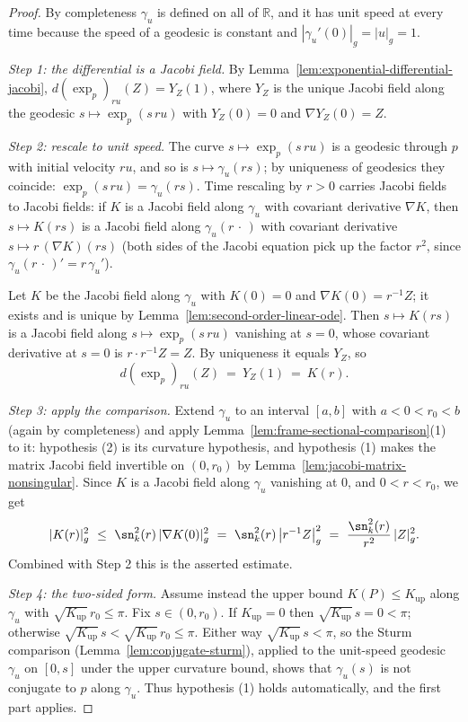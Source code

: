 \begin{proof}
\leanok
By completeness $\gamma_u$ is defined on all of $\mathbb R$, and it has unit
speed at every time because the speed of a geodesic is constant and
$|\gamma_u'(0)|_g=|u|_g=1$.

\emph{Step 1: the differential is a Jacobi field.} By
Lemma~\ref{lem:exponential-differential-jacobi},
$d(\exp_p)_{ru}(Z)=Y_Z(1)$, where $Y_Z$ is the unique Jacobi field along the
geodesic $s\mapsto\exp_p(s\,ru)$ with $Y_Z(0)=0$ and $\nabla Y_Z(0)=Z$.

\emph{Step 2: rescale to unit speed.} The curve $s\mapsto\exp_p(s\,ru)$ is a
geodesic through $p$ with initial velocity $ru$, and so is $s\mapsto\gamma_u(rs)$;
by uniqueness of geodesics they coincide:
$\exp_p(s\,ru)=\gamma_u(rs)$. Time rescaling by $r>0$ carries Jacobi fields to
Jacobi fields: if $K$ is a Jacobi field along $\gamma_u$ with covariant
derivative $\nabla K$, then $s\mapsto K(rs)$ is a Jacobi field along
$\gamma_u(r\,\cdot\,)$ with covariant derivative $s\mapsto r\,(\nabla K)(rs)$
(both sides of the Jacobi equation pick up the factor $r^2$, since
$\gamma_u(r\,\cdot\,)'=r\,\gamma_u'$).

Let $K$ be the Jacobi field along $\gamma_u$ with $K(0)=0$ and $\nabla
K(0)=r^{-1}Z$; it exists and is unique by
Lemma~\ref{lem:second-order-linear-ode}. Then $s\mapsto K(rs)$ is a Jacobi
field along $s\mapsto\exp_p(s\,ru)$ vanishing at $s=0$, whose covariant
derivative at $s=0$ is $r\cdot r^{-1}Z=Z$. By uniqueness it equals $Y_Z$, so
$$d(\exp_p)_{ru}(Z)\ =\ Y_Z(1)\ =\ K(r).$$

\emph{Step 3: apply the comparison.} Extend $\gamma_u$ to an interval $[a,b]$
with $a<0<r_0<b$ (again by completeness) and apply
Lemma~\ref{lem:frame-sectional-comparison}(1) to it: hypothesis (2) is its
curvature hypothesis, and hypothesis (1) makes the matrix Jacobi field
invertible on $(0,r_0)$ by Lemma~\ref{lem:jacobi-matrix-nonsingular}. Since $K$
is a Jacobi field along $\gamma_u$ vanishing at $0$, and $0<r<r_0$, we get
$$|K(r)|_g^2\ \le\ \sn_k^2(r)\,|\nabla K(0)|_g^2
\ =\ \sn_k^2(r)\,\bigl|r^{-1}Z\bigr|_g^2
\ =\ \frac{\sn_k^2(r)}{r^2}\,|Z|_g^2 .$$
Combined with Step 2 this is the asserted estimate.

\emph{Step 4: the two-sided form.} Assume instead the upper bound $K(P)\le
K_{\mathrm{up}}$ along $\gamma_u$ with $\sqrt{K_{\mathrm{up}}}\,r_0\le\pi$. Fix
$s\in(0,r_0)$. If $K_{\mathrm{up}}=0$ then $\sqrt{K_{\mathrm{up}}}\,s=0<\pi$;
otherwise $\sqrt{K_{\mathrm{up}}}\,s<\sqrt{K_{\mathrm{up}}}\,r_0\le\pi$. Either
way $\sqrt{K_{\mathrm{up}}}\,s<\pi$, so the Sturm comparison
(Lemma~\ref{lem:conjugate-sturm}), applied to the unit-speed geodesic $\gamma_u$
on $[0,s]$ under the upper curvature bound, shows that $\gamma_u(s)$ is not
conjugate to $p$ along $\gamma_u$. Thus hypothesis (1) holds automatically, and
the first part applies.
\end{proof}

